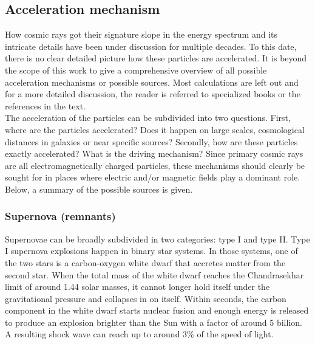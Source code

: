 

\subsection{Acceleration mechanism}
How cosmic rays got their signature slope in the energy spectrum and its intricate details have been under discussion for multiple decades. To this date, there is no clear detailed picture how these particles are accelerated. It is beyond the scope of this work to give a comprehensive overview of all possible acceleration mechanisms or possible sources. Most calculations are left out and for a more detailed discussion, the reader is referred to specialized books or the references in the text.\\
\newline
The acceleration of the particles can be subdivided into two questions. First, where are the particles accelerated? Does it happen on large scales, cosmological distances in galaxies or near specific sources? Secondly, how are these particles exactly accelerated? What is the driving mechanism? Since primary cosmic rays are all electromagnetically charged particles, these mechanisms should clearly be sought for in places where electric and/or magnetic fields play a dominant role. Below, a summary of the possible sources is given.




\subsubsection{Supernova (remnants)}
\label{subsubsec:supernovae}
Supernovae can be broadly subdivided in two categories: type I and type II. Type I supernova explosions happen in binary star systems. In those systems, one of the two stars is a carbon-oxygen white dwarf that accretes matter from the second star. When the total mass of the white dwarf reaches the Chandrasekhar limit of around 1.44 solar masses, it cannot longer hold itself under the gravitational pressure and collapses in on itself. Within seconds, the carbon component in the white dwarf starts nuclear fusion and enough energy is released to produce an explosion brighter than the Sun with a factor of around 5 billion. 
A resulting shock wave can reach up to around 3\% of the speed of light.

